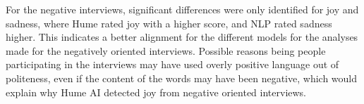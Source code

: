 For the negative interviews, significant differences were only identified for joy and sadness, where Hume rated joy with a higher score, and NLP rated sadness higher. This indicates a better alignment for the different models for the analyses made for the negatively oriented interviews. Possible reasons being people participating in the interviews may have used overly positive language out of politeness, even if the content of the words may have been negative, which would explain why Hume AI detected joy from negative oriented interviews.
